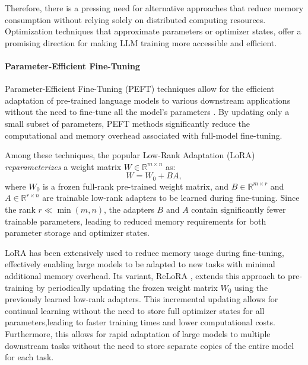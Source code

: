 Therefore, there is a pressing need for alternative approaches that reduce memory consumption without relying solely on distributed computing resources. Optimization techniques that approximate parameters or optimizer states, offer a promising direction for making LLM training more accessible and efficient.

\def\rr{\mathbb{R}}

\paragraph{Parameter-Efficient Fine-Tuning}

Parameter-Efficient Fine-Tuning (PEFT) techniques allow for the efficient adaptation of pre-trained language models to various downstream applications without the need to fine-tune all the model's parameters \citep{dingDeltaTuningComprehensive2022}. By updating only a small subset of parameters, PEFT methods significantly reduce the computational and memory overhead associated with full-model fine-tuning.

Among these techniques, the popular Low-Rank Adaptation (LoRA) \citep{huLoRALowRankAdaptation2021} \emph{reparameterizes} a weight matrix $W \in \mathbb{R}^{m \times n}$ as:
\begin{equation}
    W = W_0 + BA,
\end{equation}
where $W_0$ is a frozen full-rank pre-trained weight matrix, and $B \in \mathbb{R}^{m \times r}$ and $A \in \mathbb{R}^{r \times n}$ are trainable low-rank adapters to be learned during fine-tuning. Since the rank $r \ll \min(m, n)$, the adapters $B$ and $A$ contain significantly fewer trainable parameters, leading to reduced memory requirements for both parameter storage and optimizer states.

LoRA has been extensively used to reduce memory usage during fine-tuning, effectively enabling large models to be adapted to new tasks with minimal additional memory overhead. Its variant, ReLoRA \citep{lialinReLoRAHighRankTraining2023}, extends this approach to pre-training by periodically updating the frozen weight matrix $W_0$ using the previously learned low-rank adapters. This incremental updating allows for continual learning without the need to store full optimizer states for all parameters,leading to faster training times and lower computational costs. Furthermore, this allows for rapid adaptation of large models to multiple downstream tasks without the need to store separate copies of the entire model for each task.

